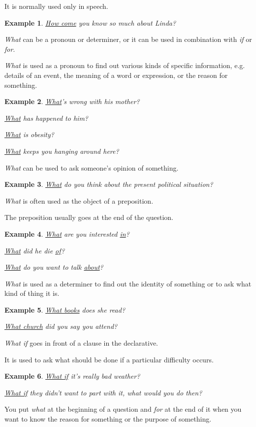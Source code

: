 \documentclass[oneside]{book}
\numberwithin{equation}{section}
\newtheorem{example}{Example}[section]
\begin{document}
It is normally used only in speech.
\begin{example}
    \underline{How come} you know so much about Linda?
\end{example}
%
\noindent{} \textit{What} can be a pronoun or determiner, or it can be used in combination with \textit{if} or \textit{for}.

%
\textit{What} is used as a pronoun to find out various kinds of specific information, e.g. details of an event, the meaning of a word or expression, or the reason for something.
\begin{example}
    \underline{What}'s wrong with his mother?
    
    \underline{What} has happened to him?
    
    \underline{What} is obesity?
    
    \underline{What} keeps you hanging around here?
\end{example}
\textit{What} can be used to ask someone's opinion of something.
\begin{example}
    \underline{What} do you think about the present political situation?
\end{example}
\textit{What} is often used as the object of a preposition.

The preposition usually goes at the end of the question.
\begin{example}
    \underline{What} are you interested \underline{in}?
    
    \underline{What} did he die \underline{of}?
    
    \underline{What} do you want to talk \underline{about}?
\end{example}
\textit{What} is used as a determiner to find out the identity of something or to ask what kind of thing it is.
\begin{example}
    \underline{What books} does she read?
    
    \underline{What church} did you say you attend?
\end{example}
\textit{What if} goes in front of a clause in the declarative.

It is used to ask what should be done if a particular difficulty occurs.
\begin{example}
    \underline{What if} it's really bad weather?
    
    \underline{What if} they didn't want to part with it, what would you do then?
\end{example}
You put \textit{what} at the beginning of a question and \textit{for} at the end of it when you want to know the reason for something or the purpose of something.
\end{document}
